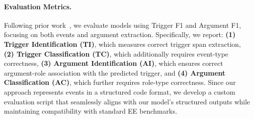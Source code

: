 \paragraph{Evaluation Metrics.} 
Following prior work~\cite{lin2020, TextEE}, we evaluate models using Trigger F1 and Argument F1, focusing on both events and argument extraction. Specifically, we report:  \textbf{(1) Trigger Identification (TI)}, which measures correct trigger span extraction, \textbf{(2) Trigger Classification (TC)}, which additionally requires event-type correctness, \textbf{(3) Argument Identification (AI)}, which ensures correct argument-role association with the predicted trigger, and \textbf{(4) Argument Classification (AC)}, which further requires role-type correctness. Since our approach represents events in a structured code format, we develop a custom evaluation script that seamlessly aligns with our model’s structured outputs while maintaining compatibility with standard EE benchmarks.


